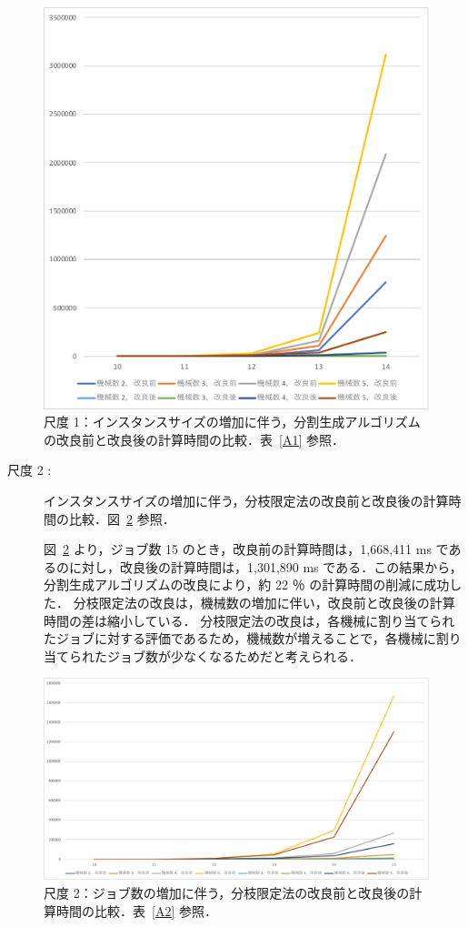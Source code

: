 \documentclass[12pt]{optlab-bachelor}
\begin{document}
\begin{figure}[h]
  \centering
  \includegraphics[width = 12cm]{figure/rgfTimeId.pdf}
  \caption{尺度 1：インスタンスサイズの増加に伴う，分割生成アルゴリズムの改良前と改良後の計算時間の比較．表~\ref{A1} 参照．}
  \label{5.1}
\end{figure}


\begin{description}
  \item[尺度 2 :] インスタンスサイズの増加に伴う，分枝限定法の改良前と改良後の計算時間の比較．図~\ref{5.2} 参照．

  図~\ref{5.2} より，ジョブ数 15 のとき，改良前の計算時間は，1,668,411 ms であるのに対し，改良後の計算時間は，1,301,890 ms である．この結果から，分割生成アルゴリズムの改良により，約 22 ％ の計算時間の削減に成功した．
  分枝限定法の改良は，機械数の増加に伴い，改良前と改良後の計算時間の差は縮小している．
  分枝限定法の改良は，各機械に割り当てられたジョブに対する評価であるため，機械数が増えることで，各機械に割り当てられたジョブ数が少なくなるためだと考えられる．
\end{description}

\begin{figure}[h]
  \centering
  \includegraphics[width = 16cm]{figure/BandBTimeId.pdf}
  \caption{尺度 2：ジョブ数の増加に伴う，分枝限定法の改良前と改良後の計算時間の比較．表~\ref{A2} 参照．}
  \label{5.2}
\end{figure}
\end{document}
